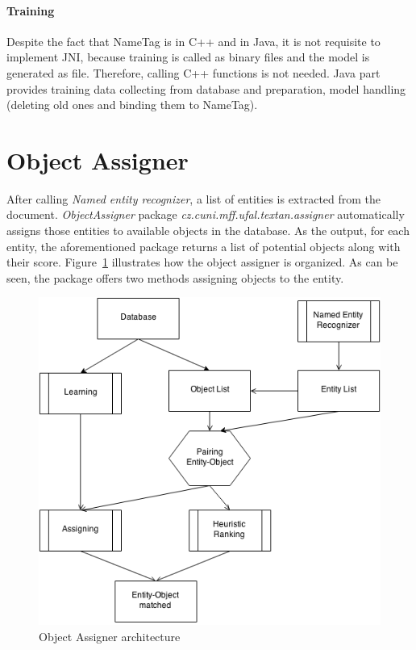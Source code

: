 \paragraph{Training}
Despite the fact that NameTag is in C++ and \textan{} in Java, it is not
requisite to implement JNI, because training is called as binary files and the
model is generated as file. Therefore, calling C++ functions is not needed. Java
part provides training data collecting from database and preparation, model
handling (deleting old ones and binding them to NameTag).

\section{Object Assigner}
\label{sec:ObjectAssigner}

After calling \emph{Named entity recognizer}, a list of entities is extracted from the document. \emph{ObjectAssigner} package
\emph{cz.\-cuni.\-mff.\-ufal.\-textan.\-assigner} automatically assigns those entities to
available objects in the database. As the output, for each entity, the
aforementioned package returns a list of potential objects along
with their score. Figure~\ref{fig:objectassigner} illustrates 
how the object assigner is organized. As can be seen, the package offers 
two methods assigning objects to the entity.

\begin{figure}[!htb]
        \centering
        \includegraphics[width=\textwidth]{Images/assigner.png}
        \caption{Object Assigner architecture}
        \label{fig:objectassigner}
\end{figure}


